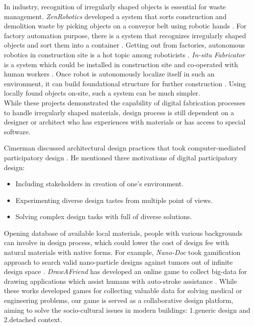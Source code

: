 In industry, recognition of irregularly shaped objects is essential for waste management.
\textit{ZenRobotics} developed a system that sorts construction and demolition waste by picking objects on a conveyor belt using robotic hands \cite{lukka2014zenrobotics}.
For factory automation purpose, there is a system that recognizes irregularly shaped objects and sort them into a container \cite{sujan2000design}.
Getting out from factories, autonomous robotics in construction site is a hot topic among roboticists \cite{feng2014towards}.
\textit{In-situ Fabricator} is a system which could be installed in construction site and co-operated with human workers \cite{dorfler2016mobile}.
Once robot is autonomously localize itself in such an environment, it can build foundational structure for further construction \cite{napp2014distributed}.
Using locally found objects on-site, such a system can be much simpler.\\

While these projects demonstrated the capability of digital fabrication processes to handle irregularly shaped materials, design process is still dependent on a designer or architect who has experiences with materials or has access to special software.

Cimerman discussed architectural design practices that took computer-mediated participatory design \cite{cimerman2000participatory}.
He mentioned three motivations of digital participatory design:
\begin{itemize}
 \item{Including stakeholders in creation of one's environment.}
 \item{Experimenting diverse design tastes from multiple point of views.}
 \item{Solving complex design tasks with full of diverse solutions.}
\end{itemize}

Opening database of available local materials, people with various backgrounds can involve in design process, which could lower the cost of design fee with natural materials with native forms.
For example, \textit{Nano-Doc} took gamification approach to search valid nano-particle designs against tumors out of infinite design space \cite{hauertcrowdsourcing}.
\textit{DrawAFriend} has developed an online game to collect big-data for drawing applications which assist humans with auto-stroke assistance \cite{limpaecher2013real}.
While these works developed games for collecting valuable data for solving medical or engineering problems, our game is served as a collaborative design platform, aiming to solve the socio-cultural issues in modern buildings: 1.generic design and 2.detached context.
